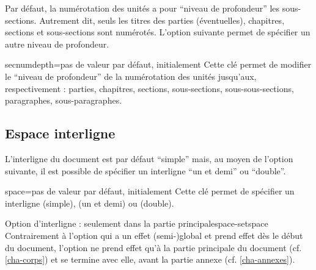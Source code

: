 Par défaut, la numérotation des unités a pour \enquote{niveau de
  profondeur} les sous-sections. Autrement dit, seuls les titres des parties
(éventuelles), chapitres, sections et sous-sections sont numérotés.  L'option
 suivante permet de spécifier un autre niveau de
profondeur.
%
{%
  \begin{docKey}{secnumdepth}{=\textbar{}\textbar{}\textbar{}\textbar{}\textbar{}\textbar{}}{pas
      de valeur par défaut, initialement }
    Cette clé permet de modifier le \enquote{niveau de profondeur} de la
    numérotation des unités jusqu'aux, respectivement : parties,
    chapitres, sections, sous-sections, sous-sous-sections, paragraphes,
    sous-paragraphes.
  \end{docKey}
}

\subsection{Espace interligne}\label{sec-interligne}
%

L'interligne du document est par défaut \enquote{simple} mais, au moyen de
l'option  suivante, il est possible de spécifier un interligne
\enquote{un et demi} ou \enquote{double}.

\begin{docKey}{space}{=\textbar{}\textbar{}}{pas de valeur par défaut,
    initialement }
  Cette clé permet de spécifier un interligne  (simple),
   (un et demi) ou  (double).
\end{docKey}

\begin{dbwarning}{Option d'interligne : seulement dans la partie
    principale}{space-setspace}
  Contrairement à l'option  qui a un effet (semi-)global et
  prend effet dès le début du document, l'option  ne prend effet
  qu'à la partie principale du document (cf. \vref{cha-corps}) et se termine
  avec elle, avant la partie annexe (cf. \vref{cha-annexes}).
\end{dbwarning}


